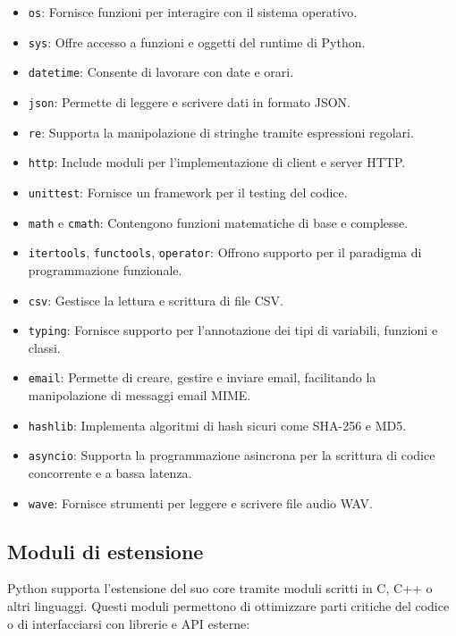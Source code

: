 \documentclass[
  letterpaper,
]{scrbook}
\begin{document}
\begin{itemize}
\item
  \texttt{os}: Fornisce funzioni per interagire con il sistema
  operativo.
\item
  \texttt{sys}: Offre accesso a funzioni e oggetti del runtime di
  Python.
\item
  \texttt{datetime}: Consente di lavorare con date e orari.
\item
  \texttt{json}: Permette di leggere e scrivere dati in formato JSON.
\item
  \texttt{re}: Supporta la manipolazione di stringhe tramite espressioni
  regolari.
\item
  \texttt{http}: Include moduli per l'implementazione di client e server
  HTTP.
\item
  \texttt{unittest}: Fornisce un framework per il testing del codice.
\item
  \texttt{math} e \texttt{cmath}: Contengono funzioni matematiche di
  base e complesse.
\item
  \texttt{itertools}, \texttt{functools}, \texttt{operator}: Offrono
  supporto per il paradigma di programmazione funzionale.
\item
  \texttt{csv}: Gestisce la lettura e scrittura di file CSV.
\item
  \texttt{typing}: Fornisce supporto per l'annotazione dei tipi di
  variabili, funzioni e classi.
\item
  \texttt{email}: Permette di creare, gestire e inviare email,
  facilitando la manipolazione di messaggi email MIME.
\item
  \texttt{hashlib}: Implementa algoritmi di hash sicuri come SHA-256 e
  MD5.
\item
  \texttt{asyncio}: Supporta la programmazione asincrona per la
  scrittura di codice concorrente e a bassa latenza.
\item
  \texttt{wave}: Fornisce strumenti per leggere e scrivere file audio
  WAV.
\end{itemize}

\subsection{Moduli di estensione}\label{moduli-di-estensione}

Python supporta l'estensione del suo core tramite moduli scritti in C,
C++ o altri linguaggi. Questi moduli permettono di ottimizzare parti
critiche del codice o di interfacciarsi con librerie e API esterne:
\end{document}
